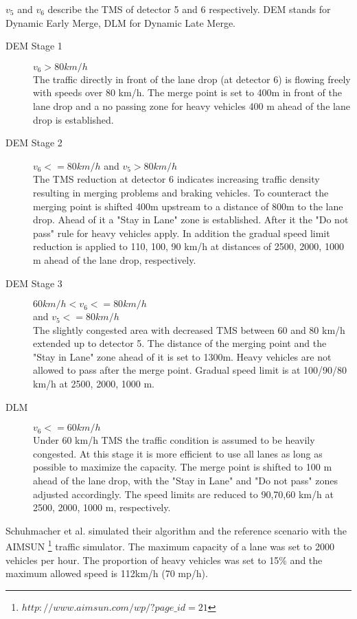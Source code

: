 \documentclass{sig-alternate}
\begin{document}
$v_5$ and $v_6$ describe the TMS of detector 5 and 6 respectively. DEM stands for Dynamic Early Merge, DLM for Dynamic Late Merge.
\begin{description}
\item[DEM Stage 1] $v_6 > 80 km/h$ \\
The traffic directly in front of the lane drop (at detector 6) is flowing freely with speeds over 80 km/h. The merge point is set to 400m in front of the lane drop and a no passing zone for heavy vehicles 400 m ahead of the lane drop is established. 
\item[DEM Stage 2] $v_6<= 80 km/h$ and $v_5>80 km/h$ \\ 
The TMS reduction at detector 6 indicates increasing traffic density resulting in merging problems and braking vehicles. To counteract the merging point is shifted 400m upstream to a distance of 800m to the lane drop. Ahead of it a "Stay in Lane" zone is established. After it the "Do not pass" rule for heavy vehicles apply. In addition the gradual speed limit reduction is applied to 110, 100, 90 km/h at distances of 2500, 2000, 1000 m ahead of the lane drop, respectively. 
\item[DEM Stage 3] $60 km/h < v_6 <= 80 km/h$ \\ and $v_5 <= 80 km/h$\\
The slightly congested area with decreased TMS between 60 and 80 km/h extended up to detector 5. The distance of the merging point and the "Stay in Lane" zone ahead of it is set to 1300m. Heavy vehicles are not allowed to pass after the merge point. Gradual speed limit is at 100/90/80 km/h at 2500, 2000, 1000 m.
\item [DLM] $v_6 <= 60 km /h$ \\
Under 60 km/h TMS the traffic condition is assumed to be heavily congested. At this stage it is more efficient to use all lanes as long as possible to maximize the capacity. The merge point is shifted to 100 m ahead of the lane drop, with the "Stay in Lane" and "Do not pass" zones adjusted accordingly. The speed limits are reduced to 90,70,60 km/h at 2500, 2000, 1000 m, respectively.
\end{description}

Schuhmacher et al. simulated their algorithm and the reference scenario with the AIMSUN \footnote{$http://www.aimsun.com/wp/?page\_id=21$} traffic simulator. 
The maximum capacity of a lane was set to 2000 vehicles per hour. The proportion of heavy vehicles was set to 15\% and the maximum allowed speed is 112km/h (70 mp/h).
%
%
\end{document}
